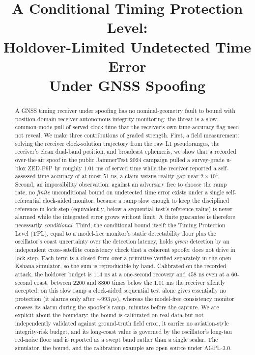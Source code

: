\documentclass[conference]{IEEEtran}
\begin{document}
\title{A Conditional Timing Protection Level:\\
Holdover-Limited Undetected Time Error\\
Under GNSS Spoofing}

\author{
}

\maketitle

\begin{abstract}
A GNSS timing receiver under spoofing has no nominal-geometry fault to bound with
position-domain receiver autonomous integrity monitoring: the threat is a slow,
common-mode pull of served clock time that the receiver's own time-accuracy flag
need not reveal. We make three contributions of graded strength. First, a field
measurement: solving the receiver clock-solution
trajectory from the raw L1 pseudoranges, the receiver's clean dual-band position,
and broadcast ephemeris, we show that a recorded over-the-air spoof in the public
JammerTest 2024 campaign pulled a survey-grade u-blox ZED-F9P by roughly
$1.01$ ms of served time while the receiver reported a self-assessed time accuracy
of at most $51$ ns, a claim-versus-reality gap near $2\times10^{4}$. Second, an
impossibility observation: against an adversary free to choose the ramp rate, no
\emph{finite} unconditional bound on undetected time error exists under a single
self-referential clock-aided monitor, because a ramp slow enough to keep the disciplined reference
in lock-step (equivalently, below a sequential test's reference value) is never
alarmed while the integrated error grows without limit. A finite guarantee is
therefore necessarily \emph{conditional}. Third, the conditional bound itself: the
Timing Protection Level (TPL), equal to a model-free monitor's static
detectability floor plus the oscillator's coast uncertainty over the detection
latency, holds \emph{given} detection by an independent cross-satellite
consistency check that a coherent spoofer does not drive in lock-step. Each term is
a closed form over a primitive verified separately in the open Kshana simulator,
so the sum is reproducible by hand. Calibrated on the recorded attack, the holdover
budget is $114$ ns at a one-second recovery and $458$ ns even at a $60$-second
coast, between $2200$ and $8800$ times below the $1.01$ ms the receiver silently
accepted; on this slow ramp a clock-aided sequential test alone gives essentially
no protection (it alarms only after $\sim$$993\,\mu$s), whereas the model-free
consistency monitor crosses its alarm during the spoofer's ramp, minutes before the
capture. We are explicit about the boundary: the bound is calibrated on
real data but not independently validated against ground-truth field error, it
carries no aviation-style integrity-risk budget, and its long-coast value is
governed by the oscillator's long-tau red-noise floor and is reported as a swept
band rather than a single scalar. The simulator, the bound, and the calibration
example are open source under AGPL-3.0.
\end{abstract}
\end{document}
